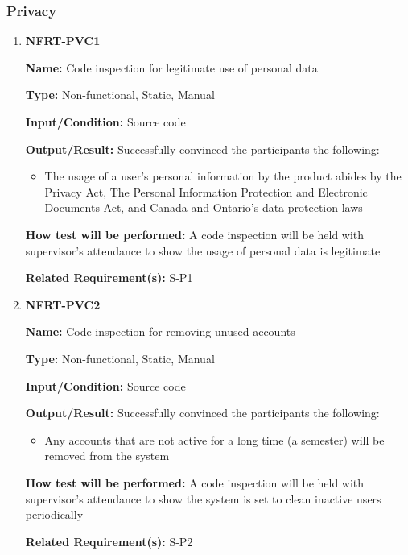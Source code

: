 \documentclass[12pt, titlepage]{article}
\begin{document}
\subsubsection{Privacy}
\begin{enumerate}
\item{\textbf{NFRT-PVC1}}

\textbf{Name:} Code inspection for legitimate use of personal data

\textbf{Type:} Non-functional, Static, Manual

\textbf{Input/Condition:} Source code

\textbf{Output/Result:} Successfully convinced the participants the following:
\begin{itemize}
\item The usage of a user's personal information by the product abides by the Privacy Act, The Personal Information Protection and Electronic Documents Act, and Canada and Ontario's data protection laws
\end{itemize}

\textbf{How test will be performed:} A code inspection will be held with supervisor's attendance to show the usage of personal data is legitimate

\textbf{Related Requirement(s):} S-P1

\item{\textbf{NFRT-PVC2}}

\textbf{Name:} Code inspection for removing unused accounts

\textbf{Type:} Non-functional, Static, Manual

\textbf{Input/Condition:} Source code

\textbf{Output/Result:} Successfully convinced the participants the following:
\begin{itemize}
\item Any accounts that are not active for a long time (a semester) will be removed from the system
\end{itemize}

\textbf{How test will be performed:} A code inspection will be held with supervisor's attendance to show the system is set to clean inactive users periodically

\textbf{Related Requirement(s):} S-P2
\end{enumerate}
\end{document}
